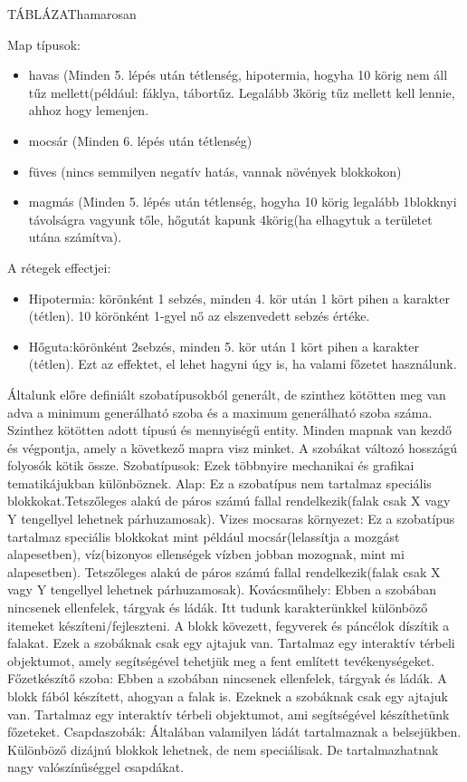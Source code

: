 
TÁBLÁZAT{hamarosan}


Map típusok:
\begin{itemize}
    \item havas (Minden 5. lépés után tétlenség, hipotermia, hogyha 10 körig nem áll tűz mellett(például: fáklya, tábortűz. Legalább 3körig tűz mellett kell lennie, ahhoz hogy lemenjen. 
    \item mocsár (Minden 6. lépés után tétlenség)
    \item füves (nincs semmilyen negatív hatás, vannak növények blokkokon)
    \item magmás (Minden 5. lépés után tétlenség, hogyha 10 körig legalább 1blokknyi távolságra vagyunk tőle, hőgutát kapunk 4körig(ha elhagytuk a területet utána számítva). 
\end{itemize}
A rétegek effectjei:
\begin{itemize}
  \item Hipotermia: körönként 1 sebzés, minden 4. kör után 1 kört pihen a karakter (tétlen). 10 körönként 1-gyel nő az elszenvedett sebzés értéke.
  \item Hőguta:körönként 2sebzés, minden 5. kör után 1 kört pihen a karakter (tétlen). Ezt az effektet, el lehet hagyni úgy is, ha valami főzetet használunk.
\end{itemize}

Általunk előre definiált szobatípusokból generált, de szinthez kötötten meg van adva a minimum generálható szoba és a maximum generálható szoba száma.
Szinthez kötötten adott típusú és mennyiségű entity.
Minden mapnak van kezdő és végpontja, amely a következő mapra visz minket.
A szobákat változó hosszágú folyosók kötik össze.
Szobatípusok:
Ezek többnyire mechanikai és grafikai tematikájukban különböznek.
Alap:
Ez a szobatípus nem tartalmaz speciális blokkokat.Tetszőleges alakú de páros számú fallal rendelkezik(falak csak X vagy Y tengellyel lehetnek párhuzamosak).
Vizes mocsaras környezet:
Ez a szobatípus tartalmaz speciális blokkokat mint például mocsár(lelassítja a mozgást alapesetben), víz(bizonyos ellenségek vízben jobban mozognak, mint mi alapesetben).
Tetszőleges alakú de páros számú fallal rendelkezik(falak csak X vagy Y tengellyel lehetnek párhuzamosak).
Kovácsműhely:
Ebben a szobában nincsenek ellenfelek, tárgyak és ládák. Itt tudunk karakterünkkel különböző itemeket készíteni/fejleszteni. A blokk kövezett, fegyverek és páncélok díszítik a falakat. Ezek a szobáknak csak egy ajtajuk van. Tartalmaz egy interaktív térbeli objektumot, amely segítségével tehetjük meg a fent említett tevékenységeket.
Főzetkészítő szoba:
Ebben a szobában nincsenek ellenfelek, tárgyak és ládák. A blokk fából készített, ahogyan a falak is. Ezeknek a szobáknak csak egy ajtajuk van. Tartalmaz egy interaktív térbeli objektumot, ami segítségével készíthetünk főzeteket.
Csapdaszobák:
Általában valamilyen ládát tartalmaznak a belsejükben.
Különböző dizájnú blokkok lehetnek, de nem speciálisak. De tartalmazhatnak nagy valószínűséggel csapdákat.

